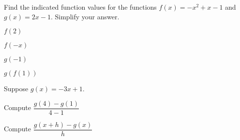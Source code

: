 \newpage


\begin{exercise}
Find the indicated function values for the functions $f(x)=-x^2+x-1$ and  $g(x)=2x-1$. Simplify your answer.

\noindent
\begin{enumerate*}[label={(\arabic*)~}]
\item $f(2)$
\item $f(-x)$
\item $g(-1)$
\item $g(f(1))$
\hfill\null
\end{enumerate*}
\end{exercise}


\begin{center}
\hfill
{}
\end{center}

\begin{exercise}
  Suppose $g(x) = -3x + 1$.
    
      \begin{enumerate*}[label={(\arabic*)~}]
      \item
      Compute $\dfrac{g(4)-g(1)}{4-1}$
      \item
      Compute $\dfrac{g(x+h)-g(x)}{h}$
      \hfill\null
      \end{enumerate*}
\end{exercise}

\begin{center}
  \hfill
  \raisebox{0.4em}{
  \rotatebox{\rotationdegree}{\parbox{\textwidth}{
    \begin{enumerate*}[label={\theexer~(\arabic*)~}]
      \item -3
      \item -3
      \hfill\null
    \end{enumerate*}
    }
  }
  }
  \end{center}

